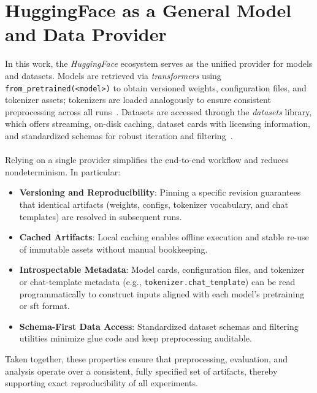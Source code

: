 \section{HuggingFace as a General Model and Data Provider}
\label{sec:hf_provider}
In this work, the \emph{HuggingFace} ecosystem serves as the unified provider for models and datasets. Models are retrieved via \emph{transformers} using \texttt{from\_pretrained(\textless model\textgreater)} to obtain versioned weights, configuration files, and tokenizer assets; tokenizers are loaded analogously to ensure consistent preprocessing across all runs~\cite{DBLP:conf/emnlp/WolfDSCDMCRLFDS20}. Datasets are accessed through the \emph{datasets} library, which offers streaming, on-disk caching, dataset cards with licensing information, and standardized schemas for robust iteration and filtering~\cite{lhoest-etal-2021-datasets}.
\\\\
Relying on a single provider simplifies the end-to-end workflow and reduces nondeterminism. In particular:
\begin{itemize}
    \item \textbf{Versioning and Reproducibility}: Pinning a specific revision guarantees that identical artifacts (weights, configs, tokenizer vocabulary, and chat templates) are resolved in subsequent runs.
    \item \textbf{Cached Artifacts}: Local caching enables offline execution and stable re-use of immutable assets without manual bookkeeping.
    \item \textbf{Introspectable Metadata}: Model cards, configuration files, and tokenizer or chat-template metadata (e.g., \texttt{tokenizer.chat\_template}) can be read programmatically to construct inputs aligned with each model’s pretraining or \acrshort{sft} format.
    \item \textbf{Schema-First Data Access}: Standardized dataset schemas and filtering utilities minimize glue code and keep preprocessing auditable.
\end{itemize}
Taken together, these properties ensure that preprocessing, evaluation, and analysis operate over a consistent, fully specified set of artifacts, thereby supporting exact reproducibility of all experiments.

